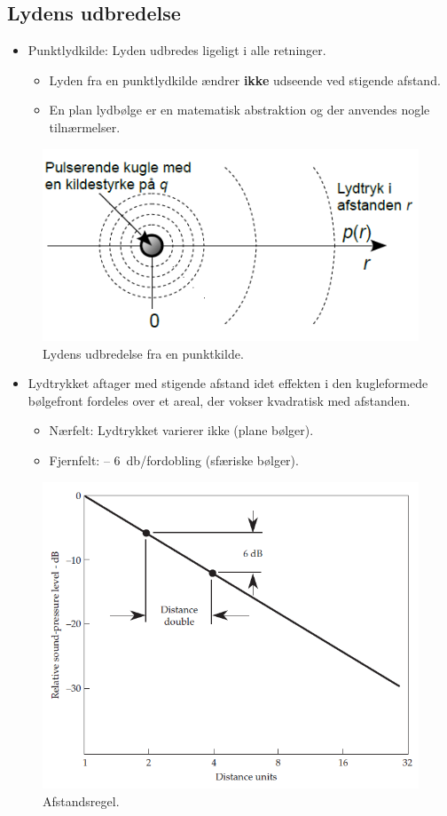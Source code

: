 \subsection{Lydens udbredelse}

\begin{itemize}
	\item Punktlydkilde: Lyden udbredes ligeligt i alle retninger.
	\begin{itemize}
		\item Lyden fra en punktlydkilde ændrer \textbf{ikke} udseende ved stigende afstand.
		\item En plan lydbølge er en matematisk abstraktion og der anvendes nogle tilnærmelser.
	\end{itemize}
\end{itemize}

\begin{figure} [H]
	\centering
	\includegraphics[width=0.7\linewidth]{graphics/9.png}
	\caption{Lydens udbredelse fra en punktkilde.}
	\label{fig:9}
\end{figure}

\begin{itemize}
	\item Lydtrykket aftager med stigende afstand idet effekten i den kugleformede bølgefront fordeles over et areal, der vokser kvadratisk med afstanden.
	\begin{itemize}
		\item Nærfelt: Lydtrykket varierer ikke  (plane bølger).
		\item Fjernfelt: – \SI{6}{\decibel}/fordobling (sfæriske bølger).
	\end{itemize}
\end{itemize}

\begin{figure} [H]
	\centering
	\includegraphics[width=0.8\linewidth]{graphics/10.png}
	\caption{Afstandsregel.}
	\label{fig:10}
\end{figure}

